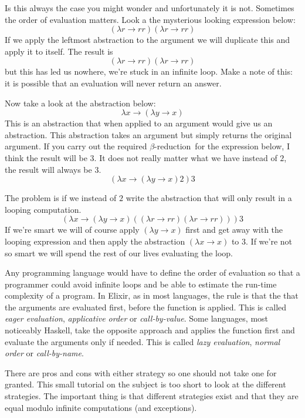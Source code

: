 \documentclass[a4paper,11pt]{article}
\newcommand{\betar}[0]{$\beta$-reduction}
\begin{document}
Is this always the case you might wonder and unfortunately it is not.
Sometimes the order of evaluation matters. Look a the mysterious
looking expression below:
$$(\lambda r \rightarrow r r)(\lambda r \rightarrow r r)$$ 
If we apply the leftmost abstraction to the argument we will duplicate
this and apply it to itself. The result is
$$(\lambda r \rightarrow r r)(\lambda r \rightarrow r r)$$ 
but this has led us nowhere, we're stuck in an infinite loop. Make a
note of this: it is possible that an evaluation will never return an answer.

Now take a look at the abstraction below:
$$\lambda x \rightarrow (\lambda y \rightarrow x)$$ 
This is an abstraction that when applied to an argument would give us
an abstraction. This abstraction takes an argument but simply returns
the original argument. If you carry out the required \betar\ for the
expression below, I think the result will be $3$. It does not really
matter what we have instead of $2$, the result will always be $3$.
$$(\lambda x \rightarrow (\lambda y \rightarrow x) 2) 3$$ 


The problem is if we instead of $2$ write the abstraction that will
only result in a looping computation.
$$(\lambda x \rightarrow (\lambda y \rightarrow x) ((\lambda r \rightarrow r r)(\lambda r \rightarrow r r)) ) 3$$ 
If we're smart we will of course apply $(\lambda y \rightarrow x)$
first and get away with the looping expression and then apply the
abstraction $(\lambda x \rightarrow x)$ to $3$. If we're not so smart
we will spend the rest of our lives evaluating the loop.

Any programming language would have to define the order of evaluation
so that a programmer could avoid infinite loops and be able to
estimate the run-time complexity of a program. In Elixir, as in most
languages, the rule is that the that the arguments are evaluated
first, before the function is applied. This is called {\em eager
  evaluation}, {\em applicative order} or {\em call-by-value}. Some
languages, most noticeably Haskell, take the opposite approach and
applies the function first and evaluate the arguments only if
needed. This is called {\em lazy evaluation}, {\em normal order} or
{\em call-by-name}.

There are pros and cons with either strategy so one should not take
one for granted. This small tutorial on the subject is too short to
look at the different strategies. The important thing is that
different strategies exist and that they are equal modulo infinite
computations (and exceptions).
\end{document}
